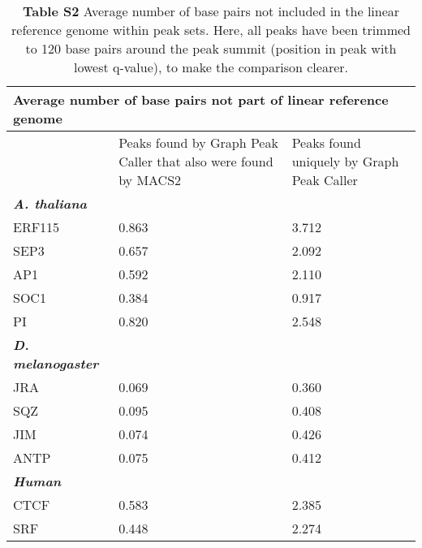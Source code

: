 \documentclass[a4paper,8pt]{article}
\title{}
\author{}
\begin{document}
\begin{table}[!ht]
\begin{adjustwidth}{-1.25in}{0in} %
\centering
\caption*{\textbf{Table S2} Average number of base pairs not included in the linear reference genome within peak sets.
  Here, all peaks have been trimmed to 120 base pairs around the peak summit (position in peak with lowest q-value), to make the comparison clearer.}
\label{tableS2}
\begin{tabularx}{1.6\textwidth}{b|X|X}
  \multicolumn{3}{l}{\textbf{Average number of base pairs not part of linear reference genome}} \\ \hline
\toprule
   & Peaks found by Graph Peak Caller that also were found by MACS2 & Peaks found uniquely by Graph Peak Caller\\
  \emph{\textbf{A. thaliana}} & & \\ \hline
  ERF115 & 0.863 & 3.712 \\
  SEP3 & 0.657 & 2.092 \\
  AP1 & 0.592 & 2.110 \\
  SOC1 & 0.384 & 0.917 \\
  PI & 0.820 & 2.548 \\ \hline
  
  \emph{\textbf{D. melanogaster}} & & \\ \hline
  JRA & 0.069 & 0.360 \\
  SQZ & 0.095 & 0.408 \\
  JIM & 0.074 & 0.426\\
  ANTP & 	0.075 & 0.412 \\
  
  \emph{\textbf{Human}} & & \\ \hline
  CTCF & 0.583 & 2.385 \\
  SRF & 0.448 & 2.274 \\
  
  
  
\bottomrule
\end{tabularx}
\end{adjustwidth}
\end{table}
\end{document}
